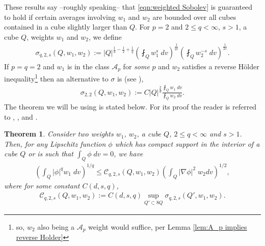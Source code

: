 \documentclass[12pt,american]{amsart}
\numberwithin{equation}{section}
\theoremstyle{plain}
\newtheorem{thm}{Theorem}[section]
\theoremstyle{definition}                  %
\begin{document}
  These results say --roughly speaking-- that \eqref{eqn:weighted Sobolev} is guaranteed to hold if certain averages involving $w_1$ and $w_2$ are bounded over all cubes contained in a cube slightly larger than $Q$. For $p=2$ and $2\leq q<\infty$, $s>1$, a cube $Q$, weights $w_1$ and $w_2$, we define
\begin{align*}
  \sigma_{q,2,s}(Q,w_1,w_2) := |Q|^{\frac{1}{d}-\frac{1}{2}+\frac{1}{q}}\left (\fint_{Q}w_1^s\;dv \right )^{\frac{1}{q s}}\left (\fint_{Q}w_2^{-s}\;dv \right )^{\frac{1}{2 s}}.
\end{align*}
If $p=q=2$ and $w_1$ is in the class $\mathcal{A}_p$ for \emph{some} $p$ and $w_2$ satisfies a reverse H\"older inequality\footnote{so, $w_2$ also being a $\mathcal{A}_p$ weight would suffice, per Lemma \ref{lem:A_p implies reverse Holder}} then an alternative to $\sigma$ is (see \cite[Theorem 1.2]{ChanilloWheeden1985}),
  \begin{align*}
    \sigma_{2,2}(Q,w_1,w_2):=  C|Q|^{\frac{2}{d}} \frac{\fint_{Q}w_1\;dv}{\fint_{Q}w_2\;dv}. 
  \end{align*}
  The theorem we will be using is stated below. For its proof the reader is referred to \cite[Theorem 1]{SawWhe1992}, \cite[Theorem 1.5]{ChanilloWheeden1985II}, and \cite[Theorem 1.2]{ChanilloWheeden1985}.
\begin{thm}\label{thm:local weighted Sobolev inequalities} 
  Consider two weights $w_1$, $w_2$, a cube $Q$, $2\leq q<\infty$ and $s>1$. Then, for any Lipschitz function $\phi$ which has compact support in the interior of a cube $Q$ or is such that $\int_Q \phi\;dv = 0$, we have
  \begin{align}\label{eqn:Local Weighted Sobolev Inequality General Weights}
    \left( \int_{Q}|\phi|^qw_1\;dv\right)^{1/q}\leq   \mathcal{C}_{q,2,s}(Q,w_1,w_2)\left( \int_{Q}|\nabla \phi|^2\; w_2dv\right)^{1/2},
  \end{align} 
  where for some constant $C(d,s,q)$,
  \begin{align*}
    \mathcal{C}_{q,2,s}(Q,w_1,w_2) := C(d,s,q)\sup \limits_{Q' \subset 8Q} \sigma_{q,2,s}(Q',w_1,w_2).
  \end{align*}
  
\end{thm}
\end{document}
